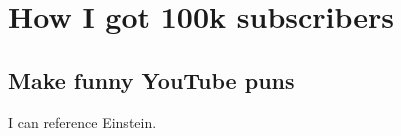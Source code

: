 \chapter{How I got 100k subscribers}
\section{Make funny YouTube puns}
I can reference Einstein\cite{einstein}.

\lipsum[1-2]